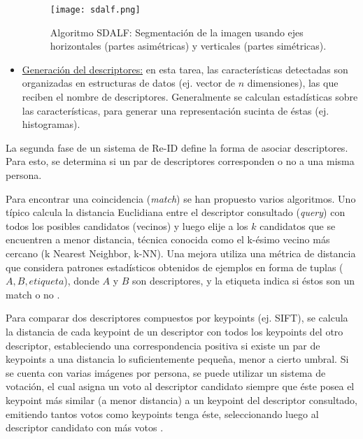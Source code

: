 \documentclass[../memoria.tex]{subfiles}
\begin{document}
\begin{itemize}
	\begin{figure}
	  \centering
	  \texttt{[image: sdalf.png]}
	  \caption{Algoritmo SDALF: Segmentación de la imagen usando ejes horizontales (partes asimétricas) y verticales (partes simétricas).}
	  \label{fig:sdalf}
	\end{figure}

	\item \underline{Generación del descriptores:} en esta tarea, las características detectadas son organizadas en estructuras de datos (ej. vector de $n$ dimensiones), las que reciben el nombre de descriptores. Generalmente se calculan estadísticas sobre las características, para generar una representación sucinta de éstas (ej. histogramas). %
\end{itemize}

La segunda fase de un sistema de Re-ID define la forma de asociar descriptores. Para esto, se determina si un par de descriptores corresponden o no a una misma persona. 

Para encontrar una coincidencia (\emph{match}) se han propuesto varios algoritmos. Uno típico calcula la distancia Euclidiana entre el descriptor consultado (\emph{query}) con todos los posibles candidatos (vecinos) y luego elije a los $k$ candidatos que se encuentren a menor distancia, técnica conocida como el k-ésimo vecino más cercano (k Nearest Neighbor, k-NN). Una mejora utiliza una métrica de distancia que considera patrones estadísticos obtenidos de ejemplos en forma de tuplas ($A,B,etiqueta$), donde $A$ y $B$ son descriptores, y la etiqueta indica si éstos son un match o no \cite{weinberger2009dml, zheng2013reidentification, dikmen2011pedestrian, hirzer2012person, hirzer2012relaxed, zheng2011person}.

Para comparar dos descriptores compuestos por keypoints (ej. SIFT), se calcula la distancia de cada keypoint de un descriptor con todos los keypoints del otro descriptor, estableciendo una correspondencia positiva si existe un par de keypoints a una distancia lo suficientemente pequeña, menor a cierto umbral. Si se cuenta con varias imágenes por persona, se puede utilizar un sistema de votación, el cual asigna un voto al descriptor candidato siempre que éste posea el keypoint más similar (a menor distancia) a un keypoint del descriptor consultado, emitiendo tantos votos como keypoints tenga éste, seleccionando luego al descriptor candidato con más votos \cite{hamdoun2008person}. 
\end{document}
